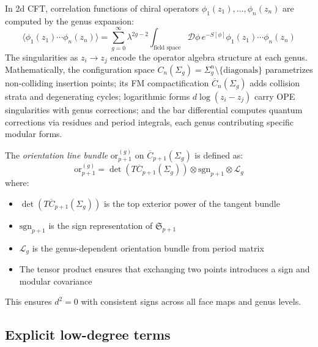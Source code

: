\begin{remark}
In 2d CFT, correlation functions of chiral operators $\phi_1(z_1), \ldots, \phi_n(z_n)$ are computed by the genus expansion:
\[
\langle \phi_1(z_1) \cdots \phi_n(z_n) \rangle = \sum_{g=0}^{\infty} \lambda^{2g-2} \int_{\text{field space}} \mathcal{D}\phi \, e^{-S[\phi]} \phi_1(z_1) \cdots \phi_n(z_n)
\]
The singularities as $z_i \to z_j$ encode the operator algebra structure at each genus. Mathematically, the configuration space $C_n(\Sigma_g) = \Sigma_g^n \setminus \{\text{diagonals}\}$ parametrizes non-colliding insertion points; its FM compactification $\overline{C}_n(\Sigma_g)$ adds collision strata and degenerating cycles; logarithmic forms $d\log(z_i - z_j)$ carry OPE singularities with genus corrections; and the bar differential computes quantum corrections via residues and period integrals, each genus contributing specific modular forms.
\end{remark}

\begin{definition}\label{def:orientation}
The \emph{orientation line bundle} $\text{or}_{p+1}^{(g)}$ on $\overline{C}_{p+1}(\Sigma_g)$ is defined as:
\[
\text{or}_{p+1}^{(g)} = \det(T\overline{C}_{p+1}(\Sigma_g)) \otimes \text{sgn}_{p+1} \otimes \mathcal{L}_g
\]
where:
\begin{itemize}
\item $\det(T\overline{C}_{p+1}(\Sigma_g))$ is the top exterior power of the tangent bundle
\item $\text{sgn}_{p+1}$ is the sign representation of $\mathfrak{S}_{p+1}$
\item $\mathcal{L}_g$ is the genus-dependent orientation bundle from period matrix
\item The tensor product ensures that exchanging two points introduces a sign and modular covariance
\end{itemize}
This ensures $d^2 = 0$ with consistent signs across all face maps and genus levels.
\end{definition}

\subsection{Explicit low-degree terms}

